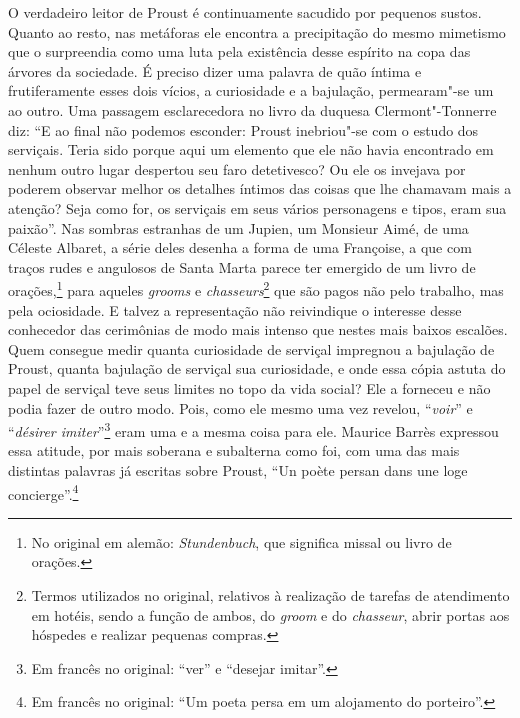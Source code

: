 O verdadeiro leitor de Proust é continuamente sacudido por pequenos
sustos. Quanto ao resto, nas metáforas ele encontra a precipitação do
mesmo mimetismo que o surpreendia como uma luta pela existência desse
espírito na copa das árvores da sociedade. É preciso dizer uma palavra
de quão íntima e frutiferamente esses dois vícios, a curiosidade e a
bajulação, permearam"-se um ao outro. Uma passagem esclarecedora no livro
da duquesa Clermont"-Tonnerre diz: ``E ao final não podemos esconder:
Proust inebriou"-se com o estudo dos serviçais. Teria sido porque aqui um
elemento que ele não havia encontrado em nenhum outro lugar despertou
seu faro detetivesco? Ou ele os invejava por poderem observar melhor os
detalhes íntimos das coisas que lhe chamavam mais a atenção? Seja como
for, os serviçais em seus vários personagens e tipos, eram sua paixão''.
Nas sombras estranhas de um Jupien, um Monsieur Aimé, de uma Céleste
Albaret, a série deles desenha a forma de uma Françoise, a que com
traços rudes e angulosos de Santa Marta parece ter emergido de um livro
de orações,\footnote{No original em alemão: \emph{Stundenbuch}, que significa
  missal ou livro de orações. \versal{[N.~T.]}} para aqueles \emph{grooms} e
\emph{chasseurs}\footnote{Termos utilizados no original, relativos
  à realização de tarefas de atendimento em hotéis, sendo a função de
  ambos, do \emph{groom} e do \emph{chasseur}, abrir portas aos hóspedes
  e realizar pequenas compras. \versal{[N.~T.]}} que são pagos não pelo trabalho, mas
pela ociosidade. E talvez a representação não reivindique o interesse
desse conhecedor das cerimônias de modo mais intenso que nestes mais
baixos escalões. Quem consegue medir quanta curiosidade de serviçal
impregnou a bajulação de Proust, quanta bajulação de serviçal sua
curiosidade, e onde essa cópia astuta do papel de serviçal teve seus
limites no topo da vida social? Ele a forneceu e não podia fazer de
outro modo. Pois, como ele mesmo uma vez revelou, ``\emph{voir}'' e
``\emph{désirer imiter}''\footnote{Em francês no original: ``ver'' e ``desejar imitar''. \versal{[N.~T.]}}
eram uma e a mesma coisa para ele. Maurice Barrès expressou essa
atitude, por mais soberana e subalterna como foi, com uma das mais
distintas palavras já escritas sobre Proust, ``Un poète persan dans une
loge concierge''.\footnote{Em francês no original: ``Um poeta persa em um alojamento do
  porteiro''. \versal{[N.~T.]}}


